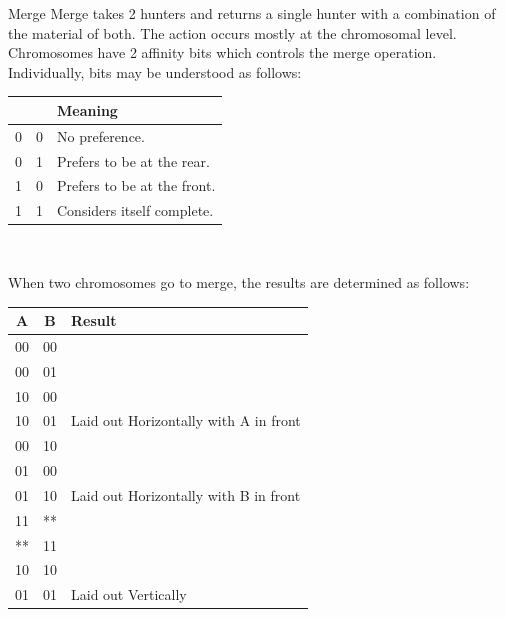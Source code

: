 \documentclass{beamer}
\begin{document}
\begin{frame}{Merge}
	Merge takes 2 hunters and returns a single hunter with a combination of the material of both.  The action occurs mostly at the chromosomal level.  \\
	Chromosomes have 2 affinity bits which controls the merge operation.\\
	Individually, bits may be understood as follows:
	\centering
	\begin{tabular}{|c c | l|}
		\hline
		 &  & Meaning \\
		\hline
		0 & 0 & No preference.\\
		0 & 1 & Prefers to be at the rear.\\
		1 & 0 & Prefers to be at the front.\\
		1 & 1 & Considers itself complete.\\
		\hline
	\end{tabular}\\
	 
	
\end{frame}
\begin{frame}
	When two chromosomes go to merge, the results are determined as follows:\\
		\centering
	\begin{tabular}{|c c | l|}
		\hline
		A & B & Result\\
		\hline
		00 & 00 & \\
		00 & 01 &\\
		10 & 00 &\\
		10 & 01 &Laid out Horizontally with A in front\\
		\hline
		00 & 10&\\
		01 & 00&\\
		01 & 10& Laid out Horizontally with B in front\\
		\hline
		11 & ** & \\
		** & 11 & \\
		10 & 10 & \\
		01 & 01 & Laid out Vertically\\
		\hline	
	\end{tabular}
	
\end{frame}
\end{document}
